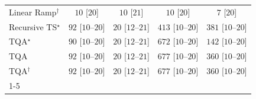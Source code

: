\begin{tabular}{l|cccc|}
Linear Ramp$^\dagger$ & {\cellcolor[HTML]{F7FCF5}} \color[HTML]{000000} $10$ [$20$] & {\cellcolor[HTML]{F7FCF5}} \color[HTML]{000000} $10$ [$21$] & {\cellcolor[HTML]{F7FCF5}} \color[HTML]{000000} $10$ [$20$] & {\cellcolor[HTML]{F7FCF5}} \color[HTML]{000000} $7$ [$20$] \\
Recursive TS$^\star$ & {\cellcolor[HTML]{E7F6E3}} \color[HTML]{000000} $92$ [$10$--$20$] & {\cellcolor[HTML]{F5FBF2}} \color[HTML]{000000} $20$ [$12$--$21$] & {\cellcolor[HTML]{6ABF71}} \color[HTML]{000000} $413$ [$10$--$20$] & {\cellcolor[HTML]{7AC77B}} \color[HTML]{000000} $381$ [$10$--$20$] \\
TQA$^\star$ & {\cellcolor[HTML]{E8F6E3}} \color[HTML]{000000} $90$ [$10$--$20$] & {\cellcolor[HTML]{F5FBF2}} \color[HTML]{000000} $20$ [$12$--$21$] & {\cellcolor[HTML]{05712F}} \color[HTML]{F1F1F1} $672$ [$10$--$20$] & {\cellcolor[HTML]{DAF0D4}} \color[HTML]{000000} $142$ [$10$--$20$] \\
TQA & {\cellcolor[HTML]{E7F6E3}} \color[HTML]{000000} $92$ [$10$--$20$] & {\cellcolor[HTML]{F5FBF2}} \color[HTML]{000000} $20$ [$12$--$21$] & {\cellcolor[HTML]{026F2E}} \color[HTML]{F1F1F1} $677$ [$10$--$20$] & {\cellcolor[HTML]{84CC83}} \color[HTML]{000000} $360$ [$10$--$20$] \\
TQA$^\dagger$ & {\cellcolor[HTML]{E7F6E3}} \color[HTML]{000000} $92$ [$10$--$20$] & {\cellcolor[HTML]{F5FBF2}} \color[HTML]{000000} $20$ [$12$--$21$] & {\cellcolor[HTML]{026F2E}} \color[HTML]{F1F1F1} $677$ [$10$--$20$] & {\cellcolor[HTML]{84CC83}} \color[HTML]{000000} $360$ [$10$--$20$] \\
\cline{1-5}
\bottomrule
\end{tabular}
